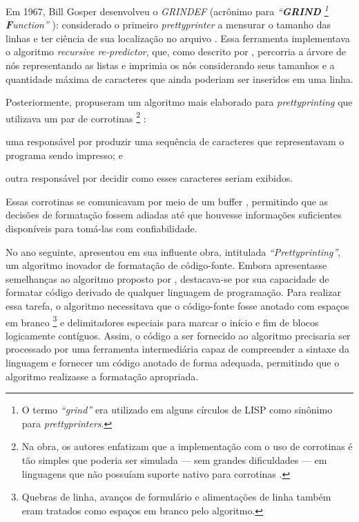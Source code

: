 \documentclass
  [11pt,a4paper,english,brazil,openright,sumario=tradicional,twoside]
  {abntex2}
\begin{document}
  Em 1967, Bill Gosper desenvolveu o \textit{GRINDEF} (acrônimo para
  \textit
    {%
      ``\textbf{GRIND}%
      \footnote
        { O termo \textit{``grind''} era utilizado em alguns círculos de LISP
          como sinônimo para \textit{prettyprinters}.}
      \textbf{F}unction''}%
  ): considerado o primeiro \textit{prettyprinter} a mensurar o tamanho das
  linhas e ter ciência de sua localização no arquivo
  \cites{gosper-2023-twubblesome}{griesemer-2022-cultural}. Essa ferramenta
  implementava o algoritmo \textit{recursive re-predictor}, que, como descrito
  por \textcite{goldstein-1973-pretty}, percorria a árvore de nós representando
  as listas e imprimia os nós considerando seus tamanhos e a quantidade máxima
  de caracteres que ainda poderiam ser inseridos em uma linha.

  Posteriormente, \textcite{hearn-1979-one} propuseram um algoritmo mais
  elaborado para \textit{prettyprinting} que utilizava um par de corrotinas%
  \footnote
    { Na obra, os autores enfatizam que a implementação com o uso de corrotinas
      é tão simples que poderia ser simulada --- sem grandes dificuldades ---
      em linguagens que não possuíam suporte nativo para corrotinas
      \cite[53]{hearn-1979-one}.}%
  :
  \begin{inparaenum}
    \item uma responsável por produzir uma sequência de caracteres que
          representavam o programa sendo impresso; e
    \item outra responsável por decidir como esses caracteres seriam exibidos.
  \end{inparaenum}
  Essas corrotinas se comunicavam por meio de um buffer ,
  permitindo que as decisões de formatação fossem adiadas até que houvesse
  informações suficientes disponíveis para tomá-las com confiabilidade.

  No ano seguinte, \textcite{oppen-1980-prettyprinting} apresentou em sua
  influente obra, intitulada \textit{``Prettyprinting''}, um algoritmo inovador
  de formatação de código-fonte. Embora apresentasse semelhanças ao algoritmo
  proposto por \textcite{hearn-1979-one}, destacava-se por sua capacidade de
  formatar código derivado de qualquer linguagem de programação. Para realizar
  essa tarefa, o algoritmo necessitava que o código-fonte fosse anotado com
  espaços em branco%
  \footnote
    { Quebras de linha, avanços de formulário e alimentações de linha também
      eram tratados como espaços em branco pelo algoritmo.}
  e delimitadores especiais para marcar o início e fim de blocos logicamente
  contíguos. Assim, o código a ser fornecido ao algoritmo precisaria ser
  processado por uma ferramenta intermediária capaz de compreender a sintaxe da
  linguagem e fornecer um código anotado de forma adequada, permitindo que o
  algoritmo realizasse a formatação apropriada.
\end{document}
